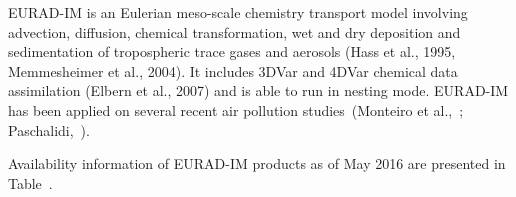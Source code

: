 \documentclass[9pt]{report}
\begin{document}
\noindent{}EURAD-IM is an Eulerian meso-scale chemistry transport model involving advection, diffusion, chemical transformation, wet and dry deposition and sedimentation of tropospheric trace gases and aerosols (Hass et al., 1995, Memmesheimer et al., 2004). It includes 3DVar and 4DVar chemical data assimilation (Elbern et al., 2007) and is able to run in nesting mode.
EURAD-IM has been applied on several recent air pollution studies~(Monteiro et al.,~; Paschalidi,~).%

Availability information of EURAD-IM products as of May 2016 are presented in Table~.%
\end{document}
